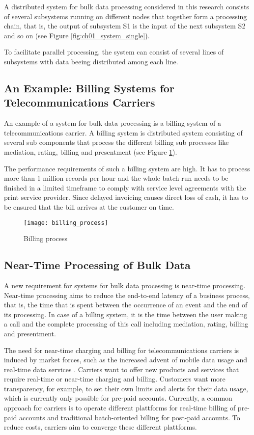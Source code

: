 A distributed system for bulk data processing considered in this research consists of several subsystems running on different nodes that together form a processing chain, that is, the output of subsystem S1 is the input of the next subsystem S2 and so on (see Figure \ref{fig:ch01_system_single}).

To facilitate parallel processing, the system can consist of several lines of subsystems with data beeing distributed among each line.

\subsection{An Example: Billing Systems for Telecommunications Carriers}
An example of a system for bulk data processing is a billing system of a telecommunications carrier. A billing system is distributed system consisting of several sub components that process the different billing sub processes like mediation, rating, billing and presentment (see Figure \ref{fig:ch01_billing_process}).

The performance requirements of such a billing system are high. It has to process more than 1 million records per hour and the whole batch run needs to be finished in a limited timeframe to comply with service level agreements with the print service provider. Since delayed invoicing causes direct loss of cash, it has to be ensured that the bill arrives at the customer on time.

\begin{figure}[htbp]
	\centering
	\texttt{[image: billing\_process]}
	\caption{Billing process}
	\label{fig:ch01_billing_process}
\end{figure}

\subsection{Near-Time Processing of Bulk Data}
A new requirement for systems for bulk data processing is near-time processing. Near-time processing aims to reduce the end-to-end latency of a business process, that is, the time that is spent between the occurrence of an event and the end of its processing. In case of a billing system, it is the time between the user making a call and the complete processing of this call including mediation, rating, billing and presentment.

The need for near-time charging and billing for telecommunications carriers is induced by market forces, such as the increased advent of mobile data usage and real-time data services \citep{Cryderman:2011aa}. Carriers want to offer new products and services that require real-time or near-time charging and billing. Customers want more transparency, for example, to set their own limits and alerts for their data usage, which is currently only possible for pre-paid accounts. Currently, a common approach for carriers is to operate different plattforms for real-time billing of pre-paid accounts and traditional batch-oriented billing for post-paid accounts. To reduce costs, carriers aim to converge these different plattforms.

